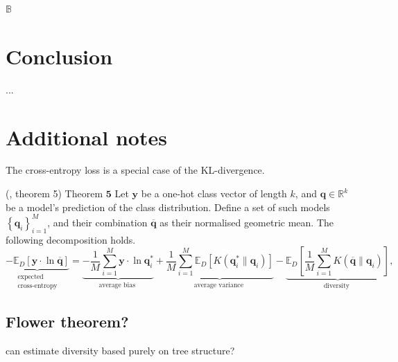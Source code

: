 \documentclass[
    a4paper, %
	fontsize=10pt, %
	twoside=false, %
]{kaobook}
\begin{document}
$\mathbb{B}$

\chapter{Conclusion}
...



\appendix %


\chapter{Additional notes}

The cross-entropy loss is a special case of the KL-divergence.
\begin{lemma} (\cite{wood23}, theorem 5) \label{thm:cross-entropy-decomp}
    Theorem $\mathbf{5}$ Let $\mathbf{y}$ be a one-hot class vector of length $k$, and $\mathbf{q} \in \mathbb{R}^k$ be a model's prediction of the class distribution. Define a set of such models $\left\{\mathbf{q}_i\right\}_{i=1}^M$, and their combination $\overline{\mathbf{q}}$ as their normalised geometric mean. The following decomposition holds.
    $$
    \underbrace{-\mathbb{E}_D[\mathbf{y} \cdot \ln \overline{\mathbf{q}}]}_{\begin{array}{c}
    \text { expected } \\
    \text { cross-entropy }
    \end{array}}=\underbrace{-\frac{1}{M} \sum_{i=1}^M \mathbf{y} \cdot \ln \mathbf{q}_i^*}_{\text {average bias }}+\underbrace{\frac{1}{M} \sum_{i=1}^M \mathbb{E}_D\left[K\left(\mathbf{q}_i^* \| \mathbf{q}_i\right)\right]}_{\text {average variance }}-\underbrace{\mathbb{E}_D\left[\frac{1}{M} \sum_{i=1}^M K\left(\overline{\mathbf{q}} \| \mathbf{q}_i\right)\right]}_{\text {diversity }},
    $$
\end{lemma}

\section{Flower theorem?}

can estimate diversity based purely on tree structure?
\end{document}
